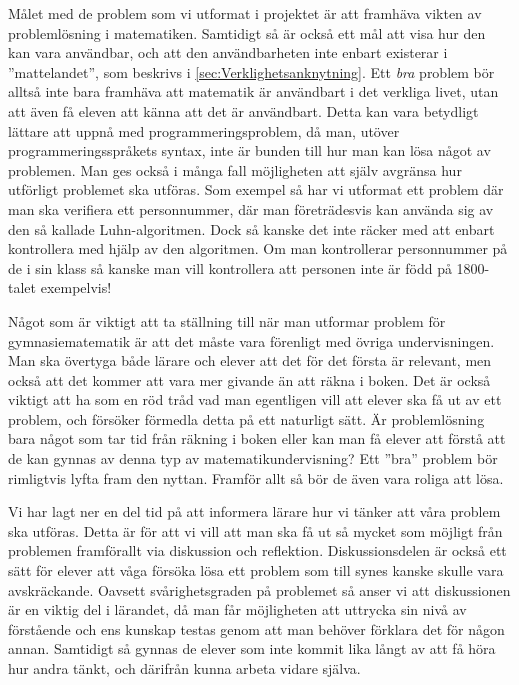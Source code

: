 \textcolor{Mahogany}{Målet med de problem som vi utformat i projektet är att framhäva vikten av problemlösning i matematiken. Samtidigt så är också ett mål att visa hur den kan vara användbar, och att den användbarheten inte enbart existerar i ''mattelandet'', som beskrivs i \ref{sec:Verklighetsanknytning}. Ett \textsl{bra} problem bör alltså inte bara framhäva att matematik är användbart i det verkliga livet, utan att även få eleven att känna att det är användbart. Detta kan vara betydligt lättare att uppnå med programmeringsproblem, då man, utöver programmeringsspråkets syntax, inte är bunden till hur man kan lösa något av problemen. Man ges också i många fall möjligheten att själv avgränsa hur utförligt problemet ska utföras. Som exempel så har vi utformat ett problem där man ska verifiera ett personnummer, där man företrädesvis kan använda sig av den så kallade Luhn-algoritmen\cite{Luhn}. Dock så kanske det inte räcker med att enbart kontrollera med hjälp av den algoritmen. Om man kontrollerar personnummer på de i sin klass så kanske man vill kontrollera att personen inte är född på 1800-talet exempelvis!}
 
\textcolor{Mahogany}{Något som är viktigt att ta ställning till när man utformar problem för gymnasiematematik är att det måste vara förenligt med övriga undervisningen. Man ska övertyga både lärare och elever att det för det första är relevant, men också att det kommer att vara mer givande än att räkna i boken. Det är också viktigt att ha som en röd tråd vad man egentligen vill att elever ska få ut av ett problem, och försöker förmedla detta på ett naturligt sätt. Är problemlösning bara något som tar tid från räkning i boken eller kan man få elever att förstå att de kan gynnas av denna typ av matematikundervisning? Ett ''bra'' problem bör rimligtvis lyfta fram den nyttan. Framför allt så bör de även vara roliga att lösa.}

\textcolor{Mahogany}{Vi har lagt ner en del tid på att informera lärare hur vi tänker att våra problem ska utföras. Detta är för att vi vill att man ska få ut så mycket som möjligt från problemen framförallt via diskussion och reflektion. Diskussionsdelen är också ett sätt för elever att våga försöka lösa ett problem som till synes kanske skulle vara avskräckande. Oavsett svårighetsgraden på problemet så anser vi att diskussionen är en viktig del i lärandet, då man får möjligheten att uttrycka sin nivå av förstående och ens kunskap testas genom att man behöver förklara det för någon annan. Samtidigt så gynnas de elever som inte kommit lika långt av att få höra hur andra tänkt, och därifrån kunna arbeta vidare själva.}

